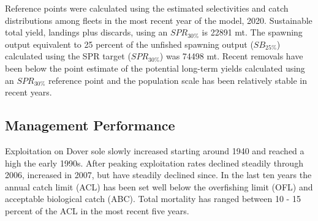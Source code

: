 \documentclass[11pt,
  english,
  a4paper,
]{article}
\begin{document}
\tagmcend\tagstructend


Reference points were calculated using the estimated selectivities and catch distributions among fleets in the most recent year of the model, 2020. Sustainable total yield, landings plus discards, using an {\(SPR_{30\%}\)\leavevmode\tagmcend\tagstructend} is 22891 mt. The spawning output equivalent to 25 percent of the unfished spawning output ({\(SB_{25\%}\)\leavevmode\tagmcend\tagstructend}) calculated using the SPR target ({\(SPR_{30\%}\)\leavevmode\tagmcend\tagstructend}) was 74498 mt. Recent removals have been below the point estimate of the potential long-term yields calculated using an {\(SPR_{30\%}\)\leavevmode\tagmcend\tagstructend} reference point and the population scale has been relatively stable in recent years.

\leavevmode\tagmcend\tagstructend\par



\clearpage


\hypertarget{management-performance}{%
\subsection*{Management Performance}\label{management-performance}}

\leavevmode\tagmcend\tagstructend


Exploitation on Dover sole slowly increased starting around 1940 and reached a high the early 1990s. After peaking exploitation rates declined steadily through 2006, increased in 2007, but have steadily declined since. In the last ten years the annual catch limit (ACL) has been set well below the overfishing limit (OFL) and acceptable biological catch (ABC). Total mortality has ranged between 10 - 15 percent of the ACL in the most recent five years.

\leavevmode\tagmcend\tagstructend\par
\end{document}
